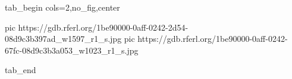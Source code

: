  
 
 
 
 

\ifcmt
  tab_begin cols=2,no_fig,center

     pic https://gdb.rferl.org/1be90000-0aff-0242-2d54-08d9c3b397ad_w1597_r1_s.jpg
		 pic https://gdb.rferl.org/1be90000-0aff-0242-67fc-08d9c3b3a053_w1023_r1_s.jpg

  tab_end
\fi
